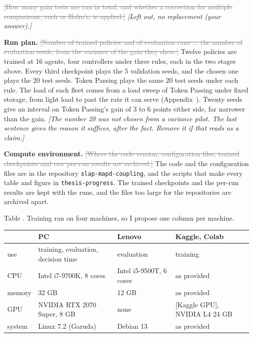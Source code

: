 \documentclass[11pt,a4paper]{article}
\newcommand{\new}[1]{\textcolor{newc}{#1}}
\newcommand{\old}[1]{\textcolor{gray}{\sout{#1}}}
\newcommand{\note}[1]{{\small\itshape [#1]}}
\newcommand{\lab}[1]{\textsf{\footnotesize\detokenize{#1}}}
\renewcommand{\ref}[1]{\lab{#1}}
\begin{document}
\old{[How many gain tests are run in total, and whether a correction for
multiple comparisons, such as Holm's, is applied.]}
\note{Left out, no replacement (your answer).}

\textbf{Run plan.} \old{[Number of trained policies and of evaluation runs
\ldots\ the number of evaluation seeds, from the variance of the gain they
show.]}
\new{Twelve policies are trained at 16 agents, four controllers under three
rules, each in the two stages above. Every third checkpoint plays the 5
validation seeds, and the chosen one plays the 20 test seeds. Token Passing
plays the same 20 test seeds under each rule. The load of each fleet comes
from a load sweep of Token Passing under fixed storage, from light load to
past the rate it can serve (Appendix~\ref{app:load}). Twenty seeds give an
interval on Token Passing's gain of 3 to 6 points either side, far narrower
than the gain.}
\note{The number 20 was not chosen from a variance pilot. The last sentence
gives the reason it suffices, after the fact. Remove it if that reads as a
claim.}

\textbf{Compute environment.}
\old{[Where the code version, configuration files, trained checkpoints and
raw per-run results are archived.]}
\new{The code and the configuration files are in the repository
\texttt{slap-mapd-coupling}, and the scripts that make every table and figure
in \texttt{thesis-progress}. The trained checkpoints and the per-run results
are kept with the runs, and the files too large for the repositories are
archived apart.}

Table \lab{tab:exp:compute}. Training ran on four machines, so I propose one
column per machine.

\begin{tabularx}{\linewidth}{l>{\raggedright\arraybackslash}X>{\raggedright\arraybackslash}X>{\raggedright\arraybackslash}X}
  \toprule
  & PC & Lenovo & Kaggle, Colab \\
  \midrule
  \new{use} & \new{training, evaluation, decision time} & \new{evaluation} & \new{training} \\
  \new{CPU} & \new{Intel i7-9700K, 8 cores} & \new{Intel i5-9500T, 6 cores} & \new{as provided} \\
  \new{memory} & \new{32 GB} & \new{12 GB} & \new{as provided} \\
  \new{GPU} & \new{NVIDIA RTX 2070 Super, 8 GB} & \new{none} & \new{[Kaggle GPU], NVIDIA L4 24 GB} \\
  \new{system} & \new{Linux 7.2 (Garuda)} & \new{Debian 13} & \new{as provided} \\
  \bottomrule
\end{tabularx}
\end{document}
